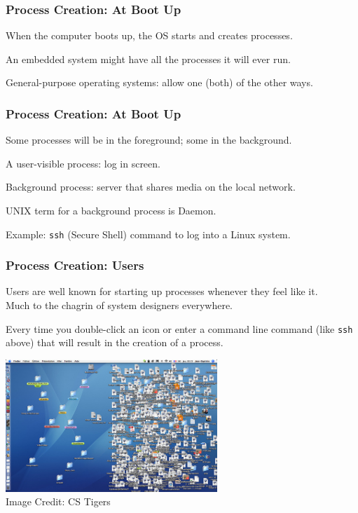 \begin{frame}
\frametitle{Process Creation: At Boot Up}

When the computer boots up, the OS starts and creates processes.

An embedded system might have all the processes it will ever run.

General-purpose operating systems: allow one (both) of the other ways.


\end{frame}

\begin{frame}
\frametitle{Process Creation: At Boot Up}

Some processes will be in the foreground; some in the background. 

A user-visible process: log in screen.

Background process: server that shares media on the local network. 

UNIX term for a background process is \alert{Daemon}.

Example: \texttt{ssh} (Secure Shell) command to log into a Linux system.


\end{frame}

\begin{frame}
\frametitle{Process Creation: Users}

Users are well known for starting up processes whenever they feel like it.\\
\quad Much to the chagrin of system designers everywhere. 

Every time you double-click an icon or enter a command line command (like \texttt{ssh} above) that will result in the creation of a process. 


\begin{center}
	\includegraphics[width=0.6\textwidth]{images/desktop-shortcut.jpg}\\
	Image Credit: CS Tigers
\end{center}

\end{frame}

